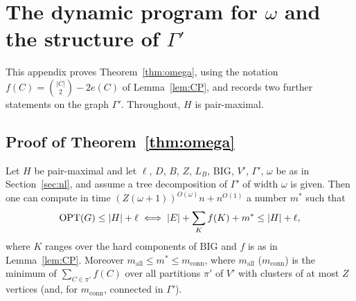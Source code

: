 \section{The dynamic program for \texorpdfstring{$\omega$}{omega} and the structure of \texorpdfstring{$\Gamma'$}{Gamma'}}\label{app:omega}
This appendix proves Theorem~\ref{thm:omega}, using the notation $f(C)=\binom{|C|}2-2e(C)$ of Lemma~\ref{lem:CP}, and records two further statements on the graph $\Gamma'$. Throughout, $H$ is pair-maximal.

\subsection{Proof of Theorem~\ref{thm:omega}}
\begin{theorem}\label{thm:omegafull}
Let $H$ be pair-maximal and let $\ell$, $D$, $B$, $Z$, $L_B$, $\mathrm{BIG}$, $V'$, $\Gamma'$, $\omega$ be as in Section~\ref{sec:nl}, and assume a tree decomposition of $\Gamma'$ of width $\omega$ is given. Then one can compute in time $(Z(\omega+1))^{O(\omega)}n+n^{O(1)}$ a number $m^*$ such that
\[
\mathrm{OPT}(G)\le|H|+\ell\iff|E|+\sum_{K}f(K)+m^*\le|H|+\ell ,
\]
where $K$ ranges over the hard components of $\mathrm{BIG}$ and $f$ is as in Lemma~\ref{lem:CP}. Moreover $m_{\mathrm{all}}\le m^*\le m_{\mathrm{conn}}$, where $m_{\mathrm{all}}$ ($m_{\mathrm{conn}}$) is the minimum of $\sum_{C\in\pi'}f(C)$ over all partitions $\pi'$ of $V'$ with clusters of at most $Z$ vertices (and, for $m_{\mathrm{conn}}$, connected in $\Gamma'$).
\end{theorem}
